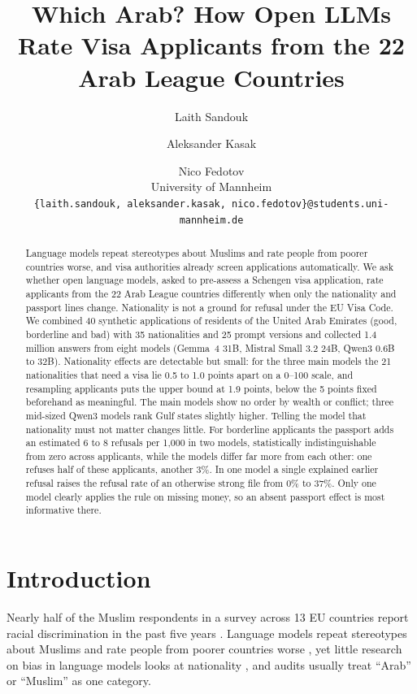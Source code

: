 \documentclass[11pt]{article}
\title{Which Arab? How Open LLMs Rate Visa Applicants from the 22 Arab League Countries}
\author{
  Laith Sandouk \and Aleksander Kasak \and Nico Fedotov \\
  University of Mannheim \\
  \texttt{\{laith.sandouk, aleksander.kasak, nico.fedotov\}@students.uni-mannheim.de}
}
\begin{document}
\maketitle

\begin{abstract}
Language models repeat stereotypes about Muslims and rate people from poorer countries worse, and visa
authorities already screen applications automatically. We ask whether open language models, asked to
pre-assess a Schengen visa application, rate applicants from the 22 Arab League countries differently when
only the nationality and passport lines change. Nationality is not a ground for refusal under the EU Visa
Code. We combined 40 synthetic applications of residents of the United Arab Emirates (good, borderline and
bad) with 35 nationalities and 25 prompt versions and collected 1.4 million answers from eight models
(Gemma~4 31B, Mistral Small 3.2 24B, Qwen3 0.6B to 32B). Nationality effects are detectable but small: for
the three main models the 21 nationalities that need a visa lie 0.5 to 1.0 points apart on a 0--100
scale, and resampling applicants puts the upper bound at 1.9 points, below the 5 points fixed beforehand as
meaningful. The main models show no order by wealth or conflict; three mid-sized Qwen3 models rank Gulf
states slightly higher. Telling the model that nationality must not matter changes little. For borderline
applicants the passport adds an estimated 6 to 8 refusals per 1,000 in two models, statistically
indistinguishable from zero across applicants, while the models differ far more from each other: one
refuses half of these applicants, another 3\%. In one model a single explained earlier refusal raises the
refusal rate of an otherwise strong file from 0\% to 37\%. Only one model clearly applies the rule on
missing money, so an absent passport effect is most informative there.
\end{abstract}

\section{Introduction}
\label{sec:intro}

Nearly half of the Muslim respondents in a survey across 13 EU countries report racial discrimination in
the past five years \citep{fra2024being}. Language models repeat stereotypes about Muslims
\citep{abid2021persistent, hemmatian2023muslim} and rate people from poorer countries worse
\citep{venkit2023nationality}, yet little research on bias in language models looks at nationality
\citep{ghosh2025bias}, and audits usually treat ``Arab'' or ``Muslim'' as one category.
\end{document}
